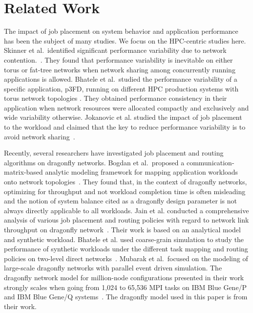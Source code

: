 \section{Related Work}
\label{sec:related work}

The impact of job placement on system behavior and application performance has been the subject of many studies.
We focus on the HPC-centric studies here. Skinner et al.\ identified significant performance variability due to network contention.~\cite{dskinner}. They found that performance variability is inevitable on either torus or fat-tree networks when network sharing among concurrently running applications is allowed.
Bhatele et al.\ studied the performance variability of a specific application, p3FD, running on different HPC production systems with torus network topologies \cite{abhinav-sc13}. They obtained performance consistency in their application when network resources were allocated compactly and exclusively and wide variability otherwise. Jokanovic et al. studied the impact of job placement to the workload and claimed that the key to reduce performance variability is to avoid network sharing~\cite{jose-ipdps15}. 

Recently, several researchers have investigated job placement and routing algorithms on dragonfly networks. Bogdan et al.\ proposed a communication-matrix-based analytic modeling framework for mapping application workloads onto network topologies~\cite{hoefler-hpdc14}. They found that, in the context of dragonfly networks, optimizing for throughput and not workload completion time is often misleading and the notion of system balance cited as a dragonfly design parameter is not always directly applicable to all workloads.
Jain et al. conducted a comprehensive analysis of various job placement and routing policies with regard to network link throughput on dragonfly network~\cite{jain-sc14}. Their work is based on an analytical model and synthetic workload. Bhatele et al. used coarse-grain simulation to study the performance of synthetic workloads under the different task mapping and routing policies on two-level direct networks~\cite{bhatele-sc11}. Mubarak et al.\ focused on  the modeling of large-scale dragonfly networks with parallel event driven simulation. The dragonfly network model for million-node configurations presented in their work strongly scales when going from 1,024 to 65,536 MPI tasks on IBM Blue Gene/P and IBM Blue Gene/Q systems~\cite{codes-dragonfly}. The dragonfly model used in this paper is from their work. 

